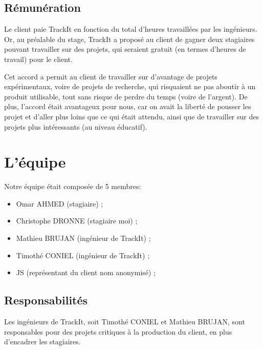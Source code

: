 \newpage

\subsection*{Rémunération}

\begin{flushleft}
  Le client paie TrackIt en fonction du total d'heures
  travaillées par les ingénieurs. Or, au préalable du stage,
  TrackIt a proposé au client de gagner deux stagiaires pouvant
  travailler sur des projets, qui seraient gratuit (en termes
  d'heures de travail) pour le client.
\end{flushleft}

\begin{flushleft}
  Cet accord a permit au client de travailler sur d'avantage de
  projets expérimentaux, voire de projets de recherche, qui
  risquaient ne pas aboutir à un produit utilisable, tout sans
  risque de perdre du temps (voire de l'argent). De plus, l'accord
  était avantageux pour nous, car on avait la liberté de pousser
  les projet et d'aller plus loins que ce qui était attendu, ainsi
  que de travailler sur des projets plus intéressants (au niveau
  éducatif).
\end{flushleft}

\section{L'équipe}

\begin{flushleft}
  Notre équipe était composée de 5 membres:
  \begin{itemize}
    \item Omar AHMED (stagiaire) ;
    \item Christophe DRONNE (stagiaire \textemdash{} moi) ;
    \item Mathieu BRUJAN (ingénieur de TrackIt) ;
    \item Timothé CONIEL (ingénieur de TrackIt) ;
    \item JS (représentant du client \textemdash{} nom anonymisé) ;
  \end{itemize}
\end{flushleft}

\subsection*{Responsabilités}

\begin{flushleft}
  Les ingénieurs de TrackIt, soit Timothé CONIEL et Mathieu BRUJAN,
  sont responsables pour des projets critiques à la production du
  client, en plus d'encadrer les stagiaires.
\end{flushleft}

